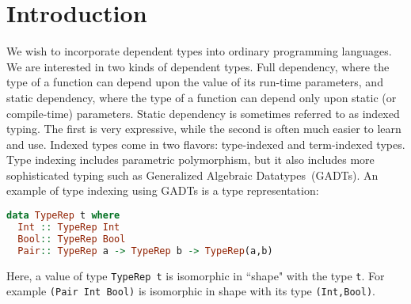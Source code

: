 \section{Introduction}
\label{sec:intro}



We wish to incorporate dependent types into ordinary programming
languages. We are interested in two kinds of dependent types.
Full dependency, where the type of a function can depend upon the value
of its run-time parameters, and static dependency, where the type
of a function can depend only upon static (or compile-time) parameters.
Static dependency is sometimes referred to as indexed typing. The first
is very expressive, while the second is often much easier to learn and 
use. Indexed types come in two flavors: type-indexed and term-indexed
types. Type indexing includes parametric polymorphism, but it also includes
more sophisticated typing such as Generalized Algebraic Datatypes~(GADTs).
An example of type indexing using GADTs is a type representation:\vspace*{-1pt}
\begin{lstlisting}[basicstyle={\ttfamily\small},language=Haskell,mathescape]
data TypeRep t where
  Int :: TypeRep Int
  Bool:: TypeRep Bool
  Pair:: TypeRep a -> TypeRep b -> TypeRep(a,b)
\end{lstlisting}\vspace*{-1pt}
Here, a value of type {\tt TypeRep t} is isomorphic in ``shape" with
the type {\tt t}. For example {\tt (Pair Int Bool)} is isomorphic in shape
with its type {\tt (Int,Bool)}.

